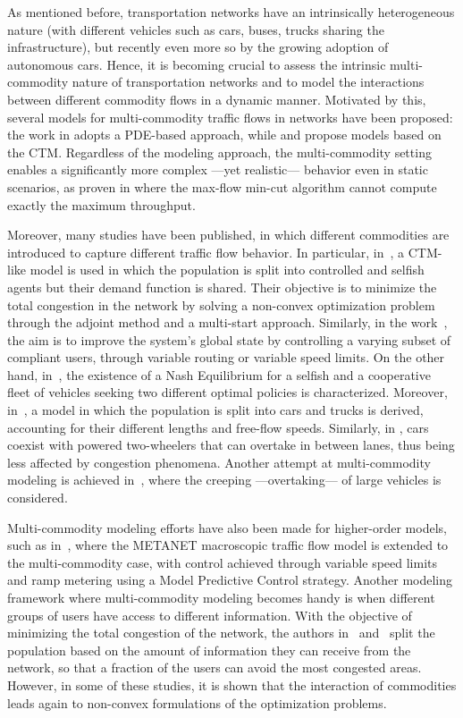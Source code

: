 \documentclass[preprint,12pt]{elsarticle}
\begin{document}
As mentioned before, transportation networks have an intrinsically heterogeneous nature (with different vehicles such as cars, buses, trucks sharing the infrastructure), but recently even more so by the growing adoption of autonomous cars. Hence, it is becoming crucial to assess the intrinsic multi-commodity nature of transportation networks and to model the interactions between different commodity flows in a dynamic manner. Motivated by this, several models for multi-commodity traffic flows in networks have been proposed: the work in \cite{Herty:2008} adopts a PDE-based approach, while \cite{Nilsson:2014} and \cite{joumaa2023} propose models based on the CTM. Regardless of the modeling approach, the multi-commodity setting enables a significantly more complex ---yet realistic--- behavior even in static scenarios, as proven in \cite{Leighton:1999} where the max-flow min-cut algorithm cannot compute exactly the maximum throughput. 

Moreover, many studies have been published, in which different commodities are introduced to capture different traffic flow behavior. In particular, in~\cite{SO-DTA}, a CTM-like model is used in which the population is split into controlled and selfish agents but their demand function is shared. Their objective is to minimize the total congestion in the network by solving a non-convex optimization problem through the adjoint method and a multi-start approach. Similarly, in the work~\cite{SO-DTA2,SO-DTA3,joumaa2025}, the aim is to improve the system's global state by controlling a varying subset of compliant users, through variable routing or variable speed limits.  On the other hand, in~\cite{Nillson:2018}, the existence of a Nash Equilibrium for a selfish and a cooperative fleet of vehicles seeking two different optimal policies is characterized. Moreover, in~\cite{Multi3}, a model in which the population is split into cars and trucks is derived, accounting for their different lengths and free-flow speeds. Similarly, in \cite{Multi5}, cars coexist with powered two-wheelers that can overtake in between lanes, thus being less affected by congestion phenomena.  Another attempt at multi-commodity modeling is achieved in~\cite{Multi4}, where the creeping ---overtaking--- of large vehicles is considered. 

Multi-commodity modeling efforts have also been made for higher-order models, such as in~\cite{DEO2009}, where the METANET macroscopic traffic flow model is extended to the multi-commodity case, with control achieved through variable speed limits and ramp metering using a Model Predictive Control strategy. Another modeling framework where multi-commodity modeling becomes handy is when different groups of users have access to different information. With the objective of minimizing the total congestion of the network, the authors in~\cite{Festa:2019} and~\cite{Multi2} split the population based on the amount of information they can receive from the network, so that a fraction of the users can avoid the most congested areas. However, in some of these studies, it is shown that the interaction of commodities leads again to non-convex formulations of the optimization problems.
\end{document}
